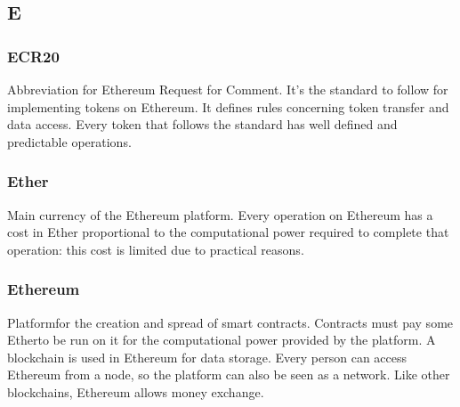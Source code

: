 \subsection*{E}

\subsubsection*{ECR20}
Abbreviation for Ethereum Request for Comment. It's the standard to follow for implementing tokens on Ethereum\glo.
It defines rules concerning token transfer and data access. Every token that follows the standard has well defined and predictable operations.



\subsubsection*{Ether}
Main currency of the Ethereum platform\glo. Every operation on Ethereum has a cost in Ether proportional to the computational power required to complete that operation: this cost is limited due to practical reasons. 

\subsubsection*{Ethereum}
Platform\glosp for the creation and spread of smart contracts\glo. Contracts must pay some Ether\glosp to be run on it for the computational power provided by the platform. A blockchain is used in Ethereum for data storage. Every person can access Ethereum from a node, so the platform can also be seen as a network. 
Like other blockchains, Ethereum allows money exchange.

